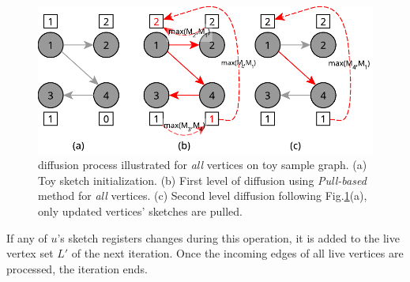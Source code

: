  \begin{figure}[!ht]
    \begin{center}
    \includegraphics[width=\linewidth]{images/sketchdiff.pdf}
    \caption{\acro diffusion process illustrated for \emph{all} vertices on toy sample graph. (a)\label{hyperinit} Toy sketch initialization. (b) \label{hyperdiff1} First level of diffusion using \emph{Pull-based} method for \emph{all} vertices. (c) \label{hyperdiff2} Second level diffusion following Fig.\ref{fig:hyperdiff}(a), only updated vertices' sketches are pulled. 
     }\label{fig:hyperdiff} 
    \end{center}
\end{figure}

If any of $u$'s sketch registers changes during this operation, it is added to the live vertex set $L'$ of the next iteration. Once the incoming edges of all live vertices are processed, the iteration ends. 
 
